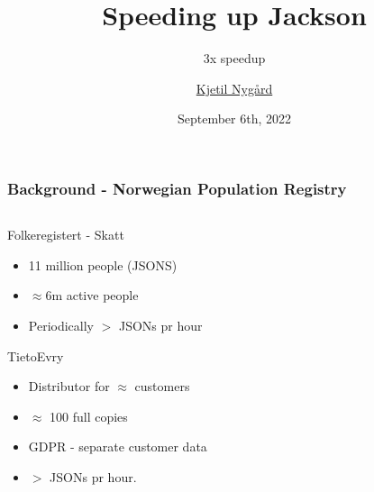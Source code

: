 \documentclass{beamer}
\title{Speeding up Jackson}
\subtitle{3x speedup}
\author{\href{pulk.hesten@gmail.com}{Kjetil Nygård}}
\institute{TietoEvry}
\date{September 6th, 2022}
\begin{document}
    \frame{\titlepage}

    \begin{frame}
        \frametitle{Background - Norwegian Population Registry}
        \begin{columns}[c]
            \begin{column}{.58\textwidth}
                \begin{block}{Folkeregistert - Skatt}
                    \begin{itemize}
                        \item 11 million people (JSONS)
                        \item $\approx 6$m active people
                        \item Periodically $>$  JSONs pr hour
                    \end{itemize}
                \end{block}
                \begin{block}{TietoEvry}
                    \begin{itemize}
                        \item Distributor for $\approx$ customers
                        \item $\approx$ 100 full copies
                        \item GDPR - separate customer data
                        \item $>$  JSONs pr hour.
                    \end{itemize}
                \end{block}
            \end{column}
            \begin{column}{.32\textwidth}
                \begin{center}

\end{center}
\end{column}
\end{columns}
\end{frame}
\end{document}
